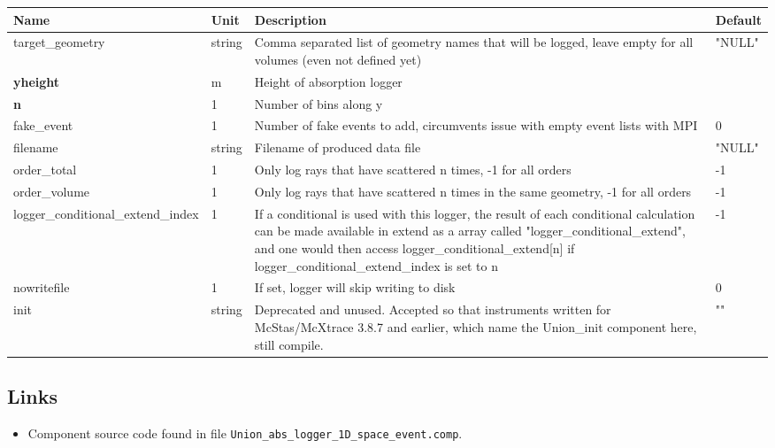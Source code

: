 \begin{longtable}{p{}p{}p{}p{}}
\toprule
\textbf{Name} & \textbf{Unit} & \textbf{Description} & \textbf{Default} \\
\midrule
\endhead
target\_geometry & string & Comma separated list of geometry names that will be logged, leave empty for all volumes (even not defined yet) & "NULL" \\
\textbf{yheight} & m & Height of absorption logger &  \\
\textbf{n} & 1 & Number of bins along y &  \\
fake\_event & 1 & Number of fake events to add, circumvents issue with empty event lists with MPI & 0 \\
filename & string & Filename of produced data file & "NULL" \\
order\_total & 1 & Only log rays that have scattered n times, -1 for all orders & -1 \\
order\_volume & 1 & Only log rays that have scattered n times in the same geometry, -1 for all orders & -1 \\
logger\_conditional\_extend\_index & 1 & If a conditional is used with this logger, the result of each conditional calculation can be made available in extend as a array called "logger\_conditional\_extend", and one would then access logger\_conditional\_extend[n] if logger\_conditional\_extend\_index is set to n & -1 \\
nowritefile & 1 & If set, logger will skip writing to disk & 0 \\
init & string & Deprecated and unused. Accepted so that instruments written for McStas/McXtrace 3.8.7 and earlier, which name the Union\_init component here, still compile. & "" \\
\bottomrule
\end{longtable}

\subsection*{Links}
\begin{itemize}
  \item Component source code found in file \texttt{Union\_abs\_logger\_1D\_space\_event.comp}.
\end{itemize}
